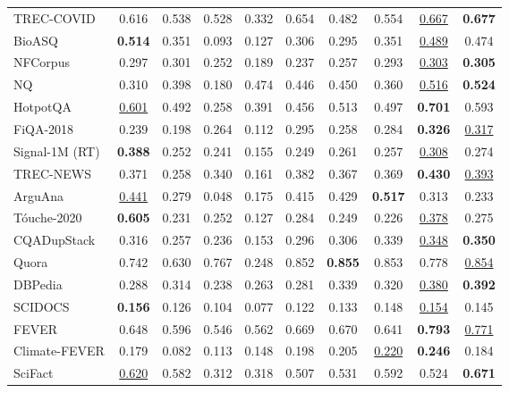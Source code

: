 \documentclass[11pt]{article}
\begin{document}
\begin{table*}[t!]
{\begin{tabular}{l | c | c | c c c c c | c c}
   
   TREC-COVID    & 0.616 & 0.538 & 0.528 & 0.332 & 0.654 & 0.482 & 0.554 & \underline{0.667} & \textbf{0.677} \\
   BioASQ        & \textbf{0.514} & 0.351 & 0.093 & 0.127 & 0.306 & 0.295 & 0.351 & \underline{0.489} & 0.474 \\
   NFCorpus      & 0.297 & 0.301 & 0.252 & 0.189 & 0.237 & 0.257 & 0.293 & \underline{0.303} & \textbf{0.305} \\ \midrule
   NQ            & 0.310 & 0.398 & 0.180 & 0.474 & 0.446 & 0.450 & 0.360 & \underline{0.516} & \textbf{0.524} \\ 
   HotpotQA      & \underline{0.601} & 0.492 & 0.258 & 0.391 & 0.456 & 0.513 & 0.497 & \textbf{0.701} & 0.593 \\ 
   FiQA-2018     & 0.239 & 0.198 & 0.264 & 0.112 & 0.295 & 0.258 & 0.284 & \textbf{0.326} & \underline{0.317} \\ \midrule
   Signal-1M (RT)& \textbf{0.388} & 0.252 & 0.241 & 0.155 & 0.249 & 0.261 & 0.257 & \underline{0.308} & 0.274 \\ \midrule
   TREC-NEWS     & 0.371 & 0.258 & 0.340 & 0.161 & 0.382 & 0.367 & 0.369 & \textbf{0.430} & \underline{0.393} \\ \midrule
   ArguAna       & \underline{0.441} & 0.279 & 0.048 & 0.175 & 0.415 & 0.429 & \textbf{0.517} & 0.313 & 0.233 \\  
   T\'ouche-2020 & \textbf{0.605} & 0.231 & 0.252 & 0.127 & 0.284 & 0.249 & 0.226 & \underline{0.378} & 0.275 \\ \midrule 
   CQADupStack   & 0.316 & 0.257 & 0.236 & 0.153 & 0.296 & 0.306 & 0.339 & \underline{0.348} & \textbf{0.350} \\
   Quora         & 0.742 & 0.630 & 0.767 & 0.248 & 0.852 & \textbf{0.855} & 0.853 & 0.778 & \underline{0.854} \\ \midrule
   DBPedia       & 0.288 & 0.314 & 0.238 & 0.263 & 0.281 & 0.339 & 0.320 & \underline{0.380} & \textbf{0.392} \\ \midrule
   SCIDOCS       & \textbf{0.156} & 0.126 & 0.104 & 0.077 & 0.122 & 0.133 & 0.148 & \underline{0.154} & 0.145 \\ \midrule
   FEVER         & 0.648 & 0.596 & 0.546 & 0.562 & 0.669 & 0.670 & 0.641 & \textbf{0.793} & \underline{0.771} \\ 
   Climate-FEVER & 0.179 & 0.082 & 0.113 & 0.148 & 0.198 & 0.205 & \underline{0.220} & \textbf{0.246} & 0.184 \\ 
   SciFact       & \underline{0.620} & 0.582 & 0.312 & 0.318 & 0.507 & 0.531 & 0.592 & 0.524 & \textbf{0.671} \\ \midrule

\end{tabular}}
\end{table*}
\end{document}
